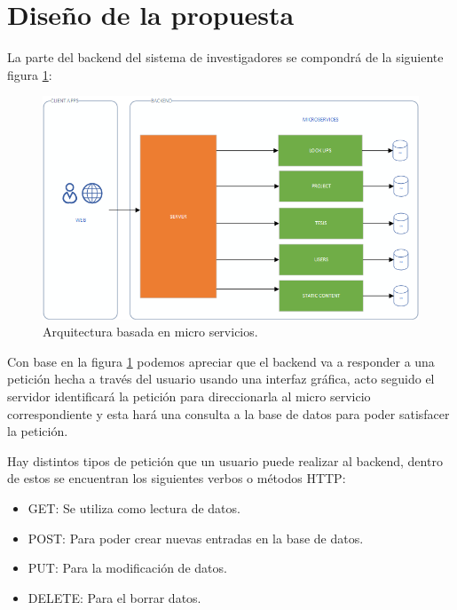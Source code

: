 
\section{Diseño de la propuesta}

    La parte del backend del sistema de investigadores se compondrá de la siguiente figura \ref{fig:architecture}:
    
    \begin{figure}[H]
        \centering
        \includegraphics[width=\textwidth]{Propuesta_Plantilla_Tesis_LaTeX_UAG/imagenes/ARCHITECTURE.png}
        \caption{Arquitectura basada en micro servicios.}
        \label{fig:architecture}
    \end{figure}
    
    Con base en la figura \ref{fig:architecture} podemos apreciar que el backend va a responder a una petición hecha a través del usuario usando una interfaz gráfica, acto seguido el servidor identificará la petición para direccionarla al micro servicio correspondiente y esta hará una consulta a la base de datos para poder satisfacer la petición.
    
    Hay distintos tipos de petición que un usuario puede realizar al backend, dentro de estos se encuentran los siguientes verbos o métodos HTTP:
    
    \begin{itemize}
        \item GET: Se utiliza como lectura de datos.
        \item POST: Para poder crear nuevas entradas en la base de datos.
        \item PUT: Para la modificación de datos.
        \item DELETE: Para el borrar datos.
    \end{itemize}
    
